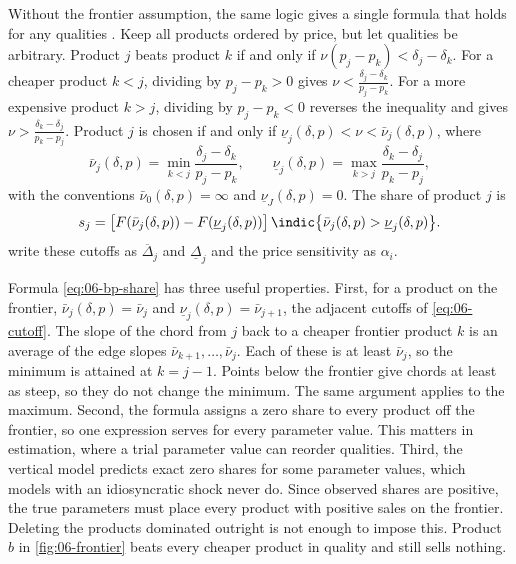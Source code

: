 Without the frontier assumption, the same logic gives a single formula that holds for any qualities
\citep[eqs.~14--17]{BerryPakes2007}. Keep all products ordered by price, but let qualities be arbitrary.
Product $j$ beats product $k$ if and only if $\nu(p_j - p_k) < \delta_j - \delta_k$. For a cheaper product
$k < j$, dividing by $p_j - p_k > 0$ gives $\nu < \frac{\delta_j - \delta_k}{p_j - p_k}$. For a more expensive
product $k > j$, dividing by $p_j - p_k < 0$ reverses the inequality and gives
$\nu > \frac{\delta_k - \delta_j}{p_k - p_j}$. Product $j$ is chosen if and only if
$\underline\nu_j(\delta, p) < \nu < \bar\nu_j(\delta, p)$, where
\begin{equation}\label{eq:06-bp-cutoffs}
  \bar\nu_j(\delta, p) = \min_{k < j} \frac{\delta_j - \delta_k}{p_j - p_k}, \qquad
  \underline\nu_j(\delta, p) = \max_{k > j} \frac{\delta_k - \delta_j}{p_k - p_j},
\end{equation}
with the conventions $\bar\nu_0(\delta, p) = \infty$ and $\underline\nu_J(\delta, p) = 0$. The share of
product $j$ is
\begin{equation}\label{eq:06-bp-share}
  s_j = \big[F(\bar\nu_j(\delta, p)) - F(\underline\nu_j(\delta, p))\big]\,
        \indic\big\{\bar\nu_j(\delta, p) > \underline\nu_j(\delta, p)\big\}.
\end{equation}
\citet{BerryPakes2007} write these cutoffs as $\overline\Delta_j$ and $\underline\Delta_j$ and the price
sensitivity as $\alpha_i$.

\begin{remark}\label{rem:06-general-cutoffs}
Formula \eqref{eq:06-bp-share} has three useful properties. First, for a product on the frontier,
$\bar\nu_j(\delta,p) = \bar\nu_j$ and $\underline\nu_j(\delta,p) = \bar\nu_{j+1}$, the adjacent cutoffs of
\eqref{eq:06-cutoff}. The slope of the chord from $j$ back to a cheaper frontier product $k$ is an average
of the edge slopes $\bar\nu_{k+1}, \dots, \bar\nu_j$. Each of these is at least $\bar\nu_j$, so the minimum is
attained at $k = j - 1$. Points below the frontier give chords at least as steep, so they do not change the minimum.
The same argument applies to the maximum. Second, the formula assigns a zero share to every product off the
frontier, so one expression serves for every parameter value. This matters in estimation, where a trial
parameter value can reorder qualities. Third, the vertical model predicts exact zero shares for some
parameter values, which models with an idiosyncratic shock never do. Since observed shares are positive,
the true parameters must place every product with positive sales on the frontier. Deleting the products
dominated outright is not enough to impose this. Product $b$ in \cref{fig:06-frontier} beats every cheaper
product in quality and still sells nothing.
\end{remark}

